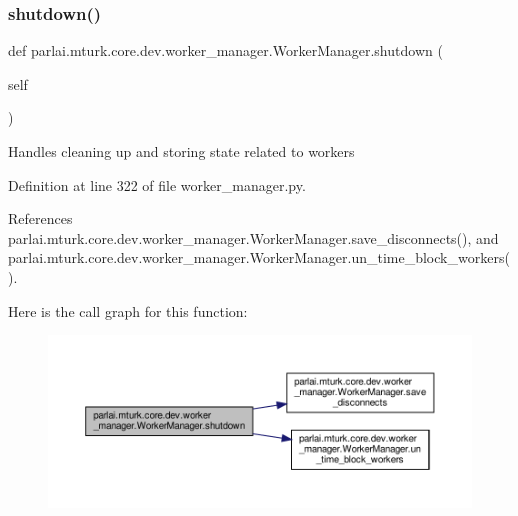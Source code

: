 \subsubsection{\texorpdfstring{shutdown()}{shutdown()}}
{\footnotesize\ttfamily def parlai.\+mturk.\+core.\+dev.\+worker\+\_\+manager.\+Worker\+Manager.\+shutdown (\begin{DoxyParamCaption}\item[{}]{self }\end{DoxyParamCaption})}

\begin{DoxyVerb}Handles cleaning up and storing state related to workers\end{DoxyVerb}
 

Definition at line 322 of file worker\+\_\+manager.\+py.



References parlai.\+mturk.\+core.\+dev.\+worker\+\_\+manager.\+Worker\+Manager.\+save\+\_\+disconnects(), and parlai.\+mturk.\+core.\+dev.\+worker\+\_\+manager.\+Worker\+Manager.\+un\+\_\+time\+\_\+block\+\_\+workers().

Here is the call graph for this function\+:
\nopagebreak
\begin{figure}[H]
\begin{center}
\leavevmode
\includegraphics[width=350pt]{classparlai_1_1mturk_1_1core_1_1dev_1_1worker__manager_1_1WorkerManager_af1fe1df324e27042479dbc71d6565e57_cgraph}
\end{center}
\end{figure}
\mbox{\label{classparlai_1_1mturk_1_1core_1_1dev_1_1worker__manager_1_1WorkerManager_a030401bc408546feaed72b2dfedd148d}} 
